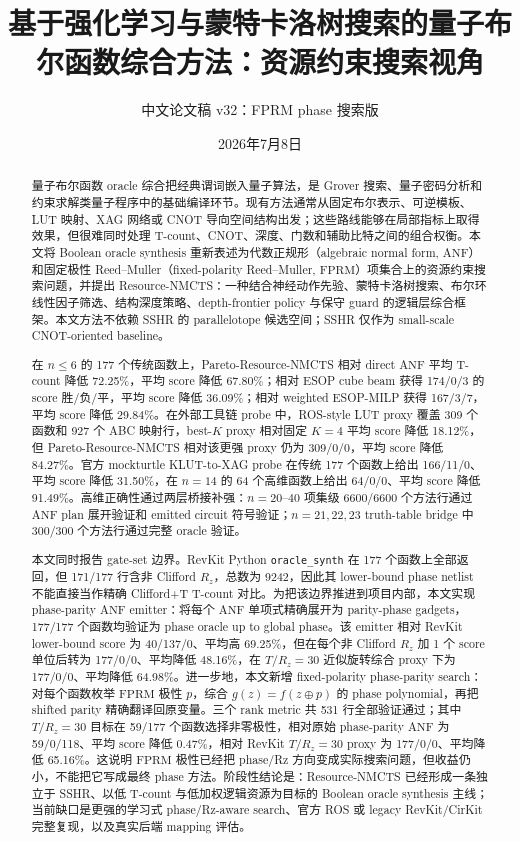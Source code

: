 \documentclass[UTF8,fontset=macnew,11pt]{ctexart}
\title{基于强化学习与蒙特卡洛树搜索的量子布尔函数综合方法：资源约束搜索视角}
\author{中文论文稿 v32：FPRM phase 搜索版}
\date{2026年7月8日}
\newcommand{\method}{Resource-NMCTS}
\newcommand{\anf}{\ensuremath{\mathrm{ANF}}}
\newcommand{\fprm}{\ensuremath{\mathrm{FPRM}}}
\newcommand{\xor}{\ensuremath{\oplus}}
\newcommand{\rz}{\ensuremath{R_z}}
\begin{document}
\pagestyle{plain}
\maketitle

\begin{abstract}
量子布尔函数 oracle 综合把经典谓词嵌入量子算法，是 Grover 搜索、量子密码分析和约束求解类量子程序中的基础编译环节。现有方法通常从固定布尔表示、可逆模板、LUT 映射、XAG 网络或 CNOT 导向空间结构出发；这些路线能够在局部指标上取得效果，但很难同时处理 T-count、CNOT、深度、门数和辅助比特之间的组合权衡。本文将 Boolean oracle synthesis 重新表述为代数正规形（algebraic normal form, \anf{}）和固定极性 Reed--Muller（fixed-polarity Reed--Muller, \fprm{}）项集合上的资源约束搜索问题，并提出 \method{}：一种结合神经动作先验、蒙特卡洛树搜索、布尔环线性因子筛选、结构深度策略、depth-frontier policy 与保守 guard 的逻辑层综合框架。本文方法不依赖 SSHR 的 parallelotope 候选空间；SSHR 仅作为 small-scale CNOT-oriented baseline。

在 $n\leq6$ 的 177 个传统函数上，Pareto-\method{} 相对 direct \anf{} 平均 T-count 降低 72.25\%，平均 score 降低 67.80\%；相对 ESOP cube beam 获得 174/0/3 的 score 胜/负/平，平均 score 降低 36.09\%；相对 weighted ESOP-MILP 获得 167/3/7，平均 score 降低 29.84\%。在外部工具链 probe 中，ROS-style LUT proxy 覆盖 309 个函数和 927 个 ABC 映射行，best-$K$ proxy 相对固定 $K=4$ 平均 score 降低 18.12\%，但 Pareto-\method{} 相对该更强 proxy 仍为 309/0/0，平均 score 降低 84.27\%。官方 mockturtle KLUT-to-XAG probe 在传统 177 个函数上给出 166/11/0、平均 score 降低 31.50\%，在 $n=14$ 的 64 个高维函数上给出 64/0/0、平均 score 降低 91.49\%。高维正确性通过两层桥接补强：$n=20$--$40$ 项集级 6600/6600 个方法行通过 \anf{} plan 展开验证和 emitted circuit 符号验证；$n=21,22,23$ truth-table bridge 中 300/300 个方法行通过完整 oracle 验证。

本文同时报告 gate-set 边界。RevKit Python \texttt{oracle\_synth} 在 177 个函数上全部返回，但 171/177 行含非 Clifford \rz{}，总数为 9242，因此其 lower-bound phase netlist 不能直接当作精确 Clifford+T T-count 对比。为把该边界推进到项目内部，本文实现 phase-parity \anf{} emitter：将每个 \anf{} 单项式精确展开为 parity-phase gadgets，177/177 个函数均验证为 phase oracle up to global phase。该 emitter 相对 RevKit lower-bound score 为 40/137/0、平均高 69.25\%，但在每个非 Clifford \rz{} 加 1 个 score 单位后转为 177/0/0、平均降低 48.16\%，在 $T/R_z=30$ 近似旋转综合 proxy 下为 177/0/0、平均降低 64.98\%。进一步地，本文新增 fixed-polarity phase-parity search：对每个函数枚举 \fprm{} 极性 $p$，综合 $g(z)=f(z\xor p)$ 的 phase polynomial，再把 shifted parity 精确翻译回原变量。三个 rank metric 共 531 行全部验证通过；其中 $T/R_z=30$ 目标在 59/177 个函数选择非零极性，相对原始 phase-parity \anf{} 为 59/0/118、平均 score 降低 0.47\%，相对 RevKit $T/R_z=30$ proxy 为 177/0/0、平均降低 65.16\%。这说明 \fprm{} 极性已经把 phase/Rz 方向变成实际搜索问题，但收益仍小，不能把它写成最终 phase 方法。阶段性结论是：\method{} 已经形成一条独立于 SSHR、以低 T-count 与低加权逻辑资源为目标的 Boolean oracle synthesis 主线；当前缺口是更强的学习式 phase/Rz-aware search、官方 ROS 或 legacy RevKit/CirKit 完整复现，以及真实后端 mapping 评估。
\end{abstract}
\end{document}
